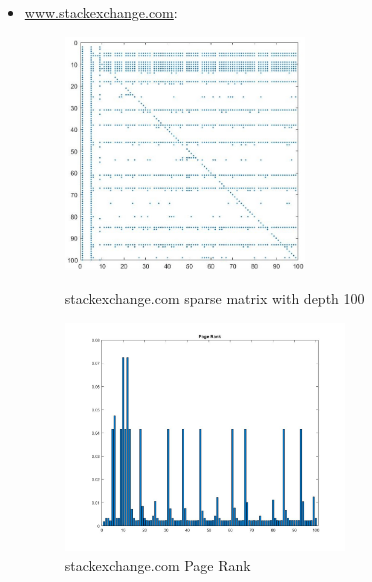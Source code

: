 \documentclass[unicode,11pt,a4paper,oneside,numbers=endperiod,openany]{scrartcl}
\begin{document}
\begin{itemize}
\newpage

    \item \href{https://stackexchange.com}{www.stackexchange.com}:
    \begin{figure}[H]
    \centering
    
    \includegraphics[width=0.6\textwidth]{se100.jpg}
    \caption{stackexchange.com sparse matrix with depth 100}
    
    \includegraphics[width=0.7\textwidth]{se100PR.jpg}
    \caption{stackexchange.com Page Rank}
    \end{figure}

\newpage


\end{itemize}
\end{document}
